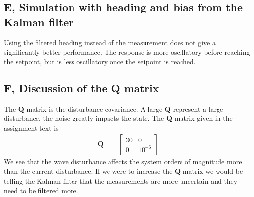 \subsection{E, Simulation with heading and bias from the Kalman filter}
Using the filtered heading instead of the measurement does not give a significantly better performance. The response is more oscillatory before reaching the setpoint, but is less oscillatory once the setpoint is reached.



\subsection{F, Discussion of the Q matrix}
The $\mathbf{Q}$ matrix is the disturbance covariance. A large $\mathbf{Q}$ represent a large disturbance, the noise greatly impacts the state. The $\mathbf{Q}$ matrix given in the assignment text is
\begin{align*}
    \mathbf{Q} &= 
    \begin{bmatrix}
        30 & 0\\
        0 & 10^{-6}
    \end{bmatrix}
\end{align*}
We see that the wave disturbance affects the system orders of magnitude more than the current disturbance.
If we were to increase the $\mathbf{Q}$ matrix we would be telling the Kalman filter that the measurements are more uncertain and they need to be filtered more.


